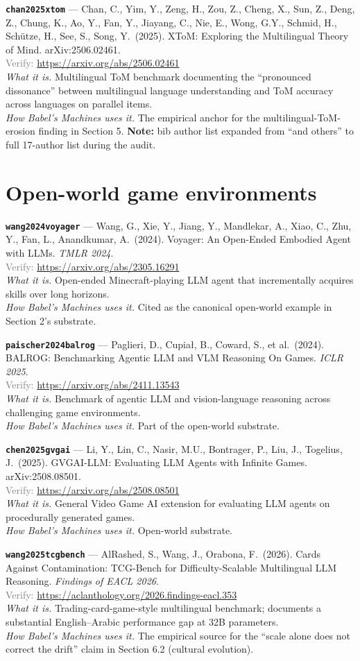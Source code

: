 \documentclass[11pt,a4paper]{article}
\newcommand{\entry}[5]{%
  \par\smallskip
  \noindent\textbf{\texttt{#1}} --- #2\\
  {\footnotesize \textcolor{gray}{Verify:} \url{#3}}\\
  \textit{What it is.} #4\\
  \textit{How Babel's Machines uses it.} #5
  \par\medskip
}
\begin{document}
\entry{chan2025xtom}
{Chan, C., Yim, Y., Zeng, H., Zou, Z., Cheng, X., Sun, Z., Deng, Z., Chung, K., Ao, Y., Fan, Y., Jiayang, C., Nie, E., Wong, G.Y., Schmid, H., Sch\"utze, H., See, S., Song, Y.\ (2025). XToM: Exploring the Multilingual Theory of Mind. arXiv:2506.02461.}
{https://arxiv.org/abs/2506.02461}
{Multilingual ToM benchmark documenting the ``pronounced dissonance'' between multilingual language understanding and ToM accuracy across languages on parallel items.}
{The empirical anchor for the multilingual-ToM-erosion finding in Section 5. \textbf{Note:} bib author list expanded from ``and others'' to full 17-author list during the audit.}

\section{Open-world game environments}

\entry{wang2024voyager}
{Wang, G., Xie, Y., Jiang, Y., Mandlekar, A., Xiao, C., Zhu, Y., Fan, L., Anandkumar, A.\ (2024). Voyager: An Open-Ended Embodied Agent with LLMs. \emph{TMLR 2024}.}
{https://arxiv.org/abs/2305.16291}
{Open-ended Minecraft-playing LLM agent that incrementally acquires skills over long horizons.}
{Cited as the canonical open-world example in Section 2's substrate.}

\entry{paischer2024balrog}
{Paglieri, D., Cupia\l, B., Coward, S., et al.\ (2024). BALROG: Benchmarking Agentic LLM and VLM Reasoning On Games. \emph{ICLR 2025}.}
{https://arxiv.org/abs/2411.13543}
{Benchmark of agentic LLM and vision-language reasoning across challenging game environments.}
{Part of the open-world substrate.}

\entry{chen2025gvgai}
{Li, Y., Lin, C., Nasir, M.U., Bontrager, P., Liu, J., Togelius, J.\ (2025). GVGAI-LLM: Evaluating LLM Agents with Infinite Games. arXiv:2508.08501.}
{https://arxiv.org/abs/2508.08501}
{General Video Game AI extension for evaluating LLM agents on procedurally generated games.}
{Open-world substrate.}

\entry{wang2025tcgbench}
{AlRashed, S., Wang, J., Orabona, F.\ (2026). Cards Against Contamination: TCG-Bench for Difficulty-Scalable Multilingual LLM Reasoning. \emph{Findings of EACL 2026}.}
{https://aclanthology.org/2026.findings-eacl.353}
{Trading-card-game-style multilingual benchmark; documents a substantial English--Arabic performance gap at 32B parameters.}
{The empirical source for the ``scale alone does not correct the drift'' claim in Section 6.2 (cultural evolution).}
\end{document}
